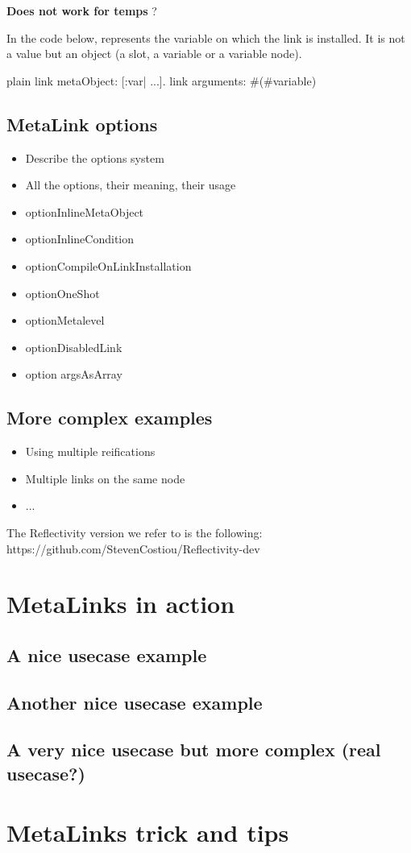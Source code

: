 \documentclass[10pt,twoside,english]{_support/latex/sbabook/sbabook}
\begin{document}
\textbf{Does not work for temps} ?

In the code below,  represents the variable on which the link is installed. It is not a value but an object (a slot, a variable or a variable node). 

\begin{displaycode}{plain}
link metaObject: [:var| ...].
link arguments: #(#variable)
\end{displaycode}
\section{MetaLink options}
\begin{itemize}
\item Describe the options system
\item All the options, their meaning, their usage
\end{itemize}

\begin{itemize}
\item optionInlineMetaObject
\item optionInlineCondition
\item optionCompileOnLinkInstallation
\item optionOneShot
\item optionMetalevel
\item optionDisabledLink
\item option argsAsArray
\end{itemize}
\section{More complex examples}
\begin{itemize}
\item Using multiple reifications
\item Multiple links on the same node
\item ...
\end{itemize}


The Reflectivity version we refer to is the following:
https://github.com/StevenCostiou/Reflectivity-dev
\chapter{MetaLinks in action}\section{A nice usecase example}\section{Another nice usecase example}\section{A very nice usecase but more complex (real usecase?)}\chapter{MetaLinks trick and tips}

\backmatter

\end{document}
